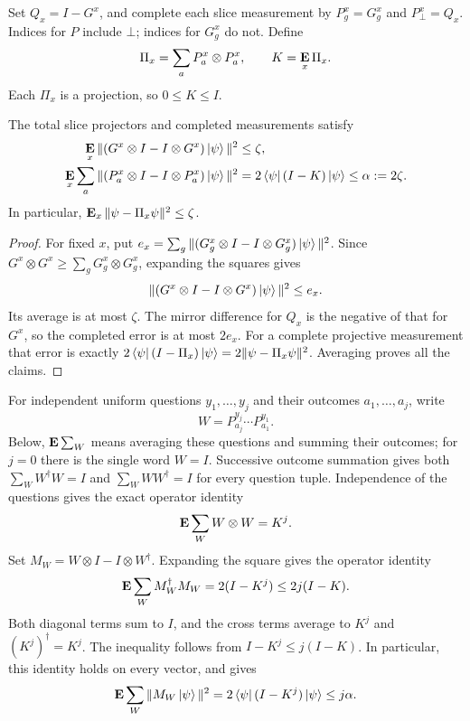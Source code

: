 \documentclass[11pt]{article}
\theoremstyle{definition}
\newcommand{\E}{\mathop{\bf E\/}}
\begin{document}
Set $Q_x=I-G^x$, and complete each slice measurement by
$P_g^x=G_g^x$ and $P_\bot^x=Q_x$.  Indices for $P$ include $\bot$;
indices for $G_g^x$ do not.  Define
\[
 \Pi_x=\sum_aP_a^x\otimes P_a^x,
 \qquad K=\E_x\Pi_x.
\]
Each $\Pi_x$ is a projection, so $0\leq K\leq I$.

\begin{lemma}[Completion]\label{lem:pasting-completion}
The total slice projectors and completed measurements satisfy
\begin{align}
 \E_x\|(G^x\otimes I-I\otimes G^x)\ket\psi\|^2
 &\leq\zeta,\label{eq:pasting-total-mirror}\\
 \E_x\sum_a\|(P_a^x\otimes I-I\otimes P_a^x)\ket\psi\|^2
 &=2\bra\psi(I-K)\ket\psi\leq\alpha:=2\zeta.
 \label{eq:gselfconall}
\end{align}
In particular, $\E_x\|\psi-\Pi_x\psi\|^2\leq\zeta$.
\end{lemma}
\begin{proof}
For fixed $x$, put
$e_x=\sum_g\|(G_g^x\otimes I-I\otimes G_g^x)\ket\psi\|^2$.
Since $G^x\otimes G^x\geq\sum_gG_g^x\otimes G_g^x$,
expanding the squares gives
\[
 \|(G^x\otimes I-I\otimes G^x)\ket\psi\|^2\leq e_x.
\]
Its average is at most $\zeta$.  The mirror difference for $Q_x$
is the negative of that for $G^x$, so the completed error is at
most $2e_x$.  For a complete projective measurement that error
is exactly $2\bra\psi(I-\Pi_x)\ket\psi
=2\|\psi-\Pi_x\psi\|^2$.  Averaging proves all the claims.
\end{proof}

For independent uniform questions $y_1,\ldots,y_j$ and their
outcomes $a_1,\ldots,a_j$, write
\[
 W=P_{a_j}^{y_j}\cdots P_{a_1}^{y_1}.
\]
Below, $\E\sum_W$ means averaging these questions and summing their
outcomes; for $j=0$ there is the single word $W=I$.  Successive
outcome summation gives both $\sum_WW^\dagger W=I$ and
$\sum_WWW^\dagger=I$ for every question tuple.  Independence of the
questions gives the exact operator identity
\[
 \E\sum_W W\otimes W=K^j.
\]
Set $M_W=W\otimes I-I\otimes W^\dagger$.  Expanding the square
gives the operator identity
\begin{equation}\label{eq:random-word-energy}
 \E\sum_W M_W^\dagger M_W
 =2(I-K^j)\leq2j(I-K).
\end{equation}
Both diagonal terms sum to $I$, and the cross terms average to
$K^j$ and $(K^j)^\dagger=K^j$.  The inequality follows from
$I-K^j\leq j(I-K)$.  In particular, this identity holds on every
vector, and  gives
\begin{equation}\label{eq:random-word-mirror}
 \E\sum_W\|M_W\ket\psi\|^2
 =2\bra\psi(I-K^j)\ket\psi\leq j\alpha.
\end{equation}
\end{document}
